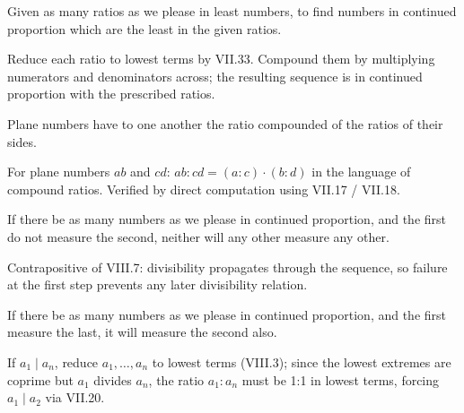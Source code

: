 \begin{claim}
\label{prop:VIII.4}
Given as many ratios as we please in least numbers, to find numbers
in continued proportion which are the least in the given ratios.
\end{claim}
\begin{evidence}
\label{ev:VIII.4}
Reduce each ratio to lowest terms by VII.33.  Compound them by
multiplying numerators and denominators across; the resulting
sequence is in continued proportion with the prescribed ratios.
\end{evidence}

\begin{claim}
\label{prop:VIII.5}
Plane numbers have to one another the ratio compounded of the ratios
of their sides.
\end{claim}
\begin{evidence}
\label{ev:VIII.5}
For plane numbers $ab$ and $cd$: $ab : cd = (a : c) \cdot (b : d)$
in the language of compound ratios.  Verified by direct computation
using VII.17 / VII.18.
\end{evidence}

\begin{claim}
\label{prop:VIII.6}
If there be as many numbers as we please in continued proportion, and
the first do not measure the second, neither will any other measure
any other.
\end{claim}
\begin{evidence}
\label{ev:VIII.6}
Contrapositive of VIII.7: divisibility propagates through the
sequence, so failure at the first step prevents any later
divisibility relation.
\end{evidence}

\begin{claim}
\label{prop:VIII.7}
If there be as many numbers as we please in continued proportion, and
the first measure the last, it will measure the second also.
\end{claim}
\begin{evidence}
\label{ev:VIII.7}
If $a_1 \mid a_n$, reduce $a_1, \dots, a_n$ to lowest terms (VIII.3);
since the lowest extremes are coprime but $a_1$ divides $a_n$, the
ratio $a_1 : a_n$ must be 1:1 in lowest terms, forcing $a_1 \mid
a_2$ via VII.20.
\end{evidence}

